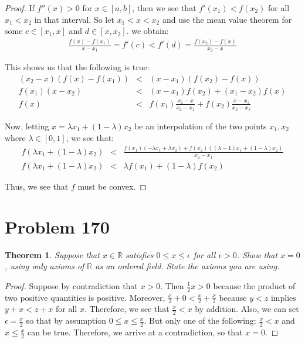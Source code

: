 \documentclass[psamsfonts]{amsart}
\newtheorem{thm}{Theorem}[section]
\theoremstyle{definition}
\theoremstyle{remark}
\numberwithin{equation}{section}
\begin{document}
\begin{proof}
If $f''(x) > 0$ for $x \in [a,b]$, then we see that $f'(x_1) < f(x_2)$ for all $x_1 < x_2$ in that interval. So let $x_1 < x < x_2$ and use the mean value theorem for some $c \in [x_1, x]$ and $d \in [x, x_2]$. we obtain:
\begin{eqnarray}
\frac{f(x) - f(x_1)}{x-x_1} = f'(c) < f'(d) = \frac{f(x_2) - f(x)}{x_2 - x} 
\end{eqnarray}

This shows us that the following is true:
\begin{eqnarray}
(x_2 - x) ( f(x) - f(x_1)) &<& (x - x_1) ( f(x_2) - f(x)) \\
f(x_1) ( x - x_2) &<& (x - x_1) f(x_2) + (x_1 - x_2) f(x) \\
f(x) &<& f(x_1) \frac{x_2 - x}{x_2 - x_1} + f(x_2) \frac{ x - x_1}{x_2 - x_1}
\end{eqnarray}

Now, letting $x = \lambda x_1 + (1- \lambda) x_2$ be an interpolation of the two points $x_1, x_2$ where $\lambda \in [0,1]$, we see that:
\begin{eqnarray}
f(\lambda x_1 + (1 - \lambda) x_2) &<& \frac{f(x_1)( - \lambda x_1 + \lambda x_2) + f(x_2)( (\lambda - 1) x_1 + (1 - \lambda) x_2)}{x_2 - x_1} \\
f(\lambda x_1 + (1 - \lambda) x_2) &<& \lambda f(x_1) + (1 - \lambda) f(x_2)
\end{eqnarray}

Thus, we see that $f$ must be convex.
\end{proof}

\section{Problem 170}

\begin{thm}
Suppose that $x \in \mathbb{R}$ satisfies $0 \leq x \leq \epsilon$ for all $\epsilon > 0$. Show that $x = 0$, using only axioms of $\mathbb{R}$ as an ordered field. State the axioms you are using. 
\end{thm}

\begin{proof}
Suppose by contradiction that $x > 0$. Then $\frac{1}{2} x > 0$ because the product of two positive quantities is positive. Moreover, $\frac{x}{2} + 0 < \frac{x}{2} + \frac{x}{2}$ because $y < z$ implies $y + x < z + x$ for all $x$. Therefore, we see that $\frac{x}{2} < x$ by addition. Also, we can set $\epsilon = \frac{x}{2}$ so that by assumption $0 \leq x \leq \frac{x}{2}$. But only one of the following: $\frac{x}{2} < x$ and $x \leq \frac{x}{2}$ can be true. Therefore, we arrive at a contradiction, so that $x = 0$. 
\end{proof}
\end{document}
